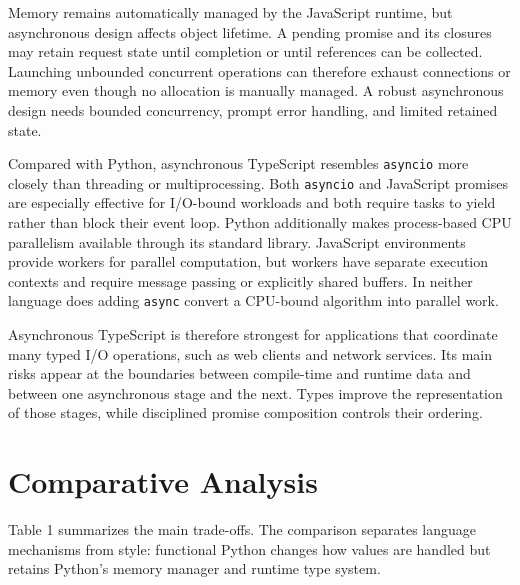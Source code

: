 \documentclass[12pt]{article}
\begin{document}
Memory remains automatically managed by the JavaScript runtime, but asynchronous design affects object lifetime. A pending promise and its closures may retain request state until completion or until references can be collected. Launching unbounded concurrent operations can therefore exhaust connections or memory even though no allocation is manually managed. A robust asynchronous design needs bounded concurrency, prompt error handling, and limited retained state.


Compared with Python, asynchronous TypeScript resembles \texttt{asyncio} more closely than threading or multiprocessing. Both \texttt{asyncio} and JavaScript promises are especially effective for I/O-bound workloads and both require tasks to yield rather than block their event loop. Python additionally makes process-based CPU parallelism available through its standard library. JavaScript environments provide workers for parallel computation, but workers have separate execution contexts and require message passing or explicitly shared buffers. In neither language does adding \texttt{async} convert a CPU-bound algorithm into parallel work.


Asynchronous TypeScript is therefore strongest for applications that coordinate many typed I/O operations, such as web clients and network services. Its main risks appear at the boundaries between compile-time and runtime data and between one asynchronous stage and the next. Types improve the representation of those stages, while disciplined promise composition controls their ordering.


\section{Comparative Analysis}

Table 1 summarizes the main trade-offs. The comparison separates language mechanisms from style: functional Python changes how values are handled but retains Python's memory manager and runtime type system.
\end{document}
